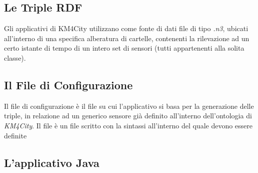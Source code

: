 \documentclass[12pt,a4paper,italian]{article}
\begin{document}
\subsection{Le Triple RDF}
Gli applicativi di KM4City utilizzano come fonte di dati file di tipo \emph{.n3}, ubicati all'interno di una specifica alberatura di cartelle, 
contenenti la rilevazione ad un certo istante di tempo di un intero set di sensori (tutti appartenenti alla solita classe).


\subsection{Il File di Configurazione}
Il file di configurazione è il file su cui l'applicativo si basa per la generazione delle triple, in relazione ad un generico sensore già definito all'interno
dell'ontologia di \emph{KM4City}. Il file è un file scritto con la sintassi  all'interno del quale devono essere definite 
\subsection{L'applicativo Java}
\end{document}
